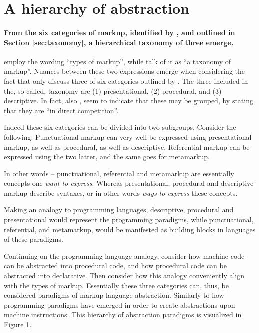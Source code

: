 \documentclass{scrreprt}
\begin{document}
\section{A hierarchy of abstraction}
\label{sec:abstraction-hierarchy}
\paragraph{From the six categories of markup, identified by \citet{coombs}, and outlined in Section \ref{sec:taxonomy}, a hierarchical taxonomy of three emerge.} \citet{coombs} employ the wording ``types of markup'', while \citet{bray} talk of it as ``a taxonomy of markup''. Nuances between these two expressions emerge when considering the fact that \citet{bray} only discuss three of six categories outlined by \citet{coombs}. The three included in the, so called, taxonomy are (1) presentational, (2) procedural, and (3) descriptive. In fact, also \citet{coombs}, seem to indicate that these may be grouped, by stating that they are ``in direct competition''.

Indeed these six categories can be divided into two subgroups. Consider the following: Punctuational markup can very well be expressed using presentational markup, as well as procedural, as well as descriptive. Referential markup can be expressed using the two latter, and the same goes for metamarkup.

In other words -- punctuational, referential and metamarkup are essentially concepts one \emph{want to express}. Whereas presentational, procedural and descriptive markup describe syntaxes, or in other words \emph{ways to express} these concepts. 

Making an analogy to programming languages, descriptive, procedural and presentational would represent the programming paradigms, while punctuational, referential, and metamarkup, would be manifested as building blocks in languages of these paradigms.

Continuing on the programming language analogy, consider how machine code can be abstracted into procedural code, and how procedural code can be abstracted into declarative. Then consider how this analogy conveniently align with the types of markup. Essentially these three categories can, thus, be considered paradigms of markup language abstraction. Similarly to how programming paradigms have emerged in order to create abstractions upon machine instructions. This hierarchy of abstraction paradigms is visualized in Figure \ref{sec:abstraction-hierarchy}.
\end{document}
